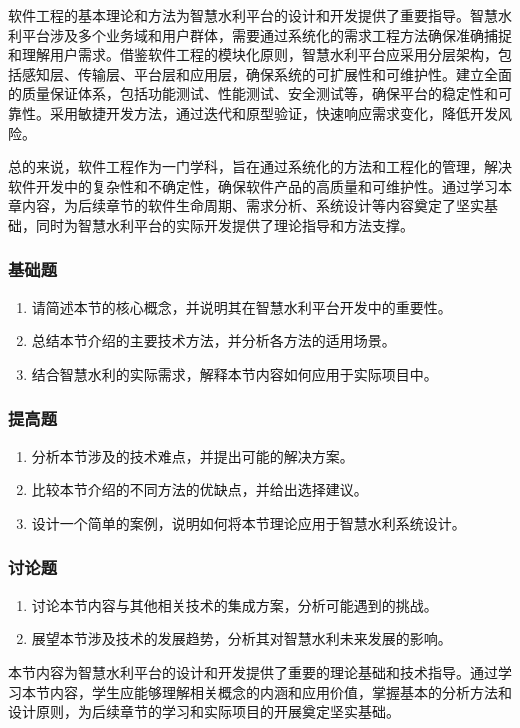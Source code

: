 \documentclass[12pt,a4paper]{article}
\providecommand{\tightlist}{%
  \setlength{\itemsep}{0pt}\setlength{\parskip}{0pt}}
\begin{document}
软件工程的基本理论和方法为智慧水利平台的设计和开发提供了重要指导。智慧水利平台涉及多个业务域和用户群体，需要通过系统化的需求工程方法确保准确捕捉和理解用户需求。借鉴软件工程的模块化原则，智慧水利平台应采用分层架构，包括感知层、传输层、平台层和应用层，确保系统的可扩展性和可维护性。建立全面的质量保证体系，包括功能测试、性能测试、安全测试等，确保平台的稳定性和可靠性。采用敏捷开发方法，通过迭代和原型验证，快速响应需求变化，降低开发风险。

总的来说，软件工程作为一门学科，旨在通过系统化的方法和工程化的管理，解决软件开发中的复杂性和不确定性，确保软件产品的高质量和可维护性。通过学习本章内容，为后续章节的软件生命周期、需求分析、系统设计等内容奠定了坚实基础，同时为智慧水利平台的实际开发提供了理论指导和方法支撑。

\subsubsection{基础题}\label{ux57faux7840ux9898-2}

\begin{enumerate}
\def\labelenumi{\arabic{enumi}.}
\tightlist
\item
  请简述本节的核心概念，并说明其在智慧水利平台开发中的重要性。
\item
  总结本节介绍的主要技术方法，并分析各方法的适用场景。
\item
  结合智慧水利的实际需求，解释本节内容如何应用于实际项目中。
\end{enumerate}

\subsubsection{提高题}\label{ux63d0ux9ad8ux9898-2}

\begin{enumerate}
\def\labelenumi{\arabic{enumi}.}
\setcounter{enumi}{3}
\tightlist
\item
  分析本节涉及的技术难点，并提出可能的解决方案。
\item
  比较本节介绍的不同方法的优缺点，并给出选择建议。
\item
  设计一个简单的案例，说明如何将本节理论应用于智慧水利系统设计。
\end{enumerate}

\subsubsection{讨论题}\label{ux8ba8ux8bbaux9898-2}

\begin{enumerate}
\def\labelenumi{\arabic{enumi}.}
\setcounter{enumi}{6}
\tightlist
\item
  讨论本节内容与其他相关技术的集成方案，分析可能遇到的挑战。
\item
  展望本节涉及技术的发展趋势，分析其对智慧水利未来发展的影响。
\end{enumerate}

本节内容为智慧水利平台的设计和开发提供了重要的理论基础和技术指导。通过学习本节内容，学生应能够理解相关概念的内涵和应用价值，掌握基本的分析方法和设计原则，为后续章节的学习和实际项目的开展奠定坚实基础。
\end{document}
